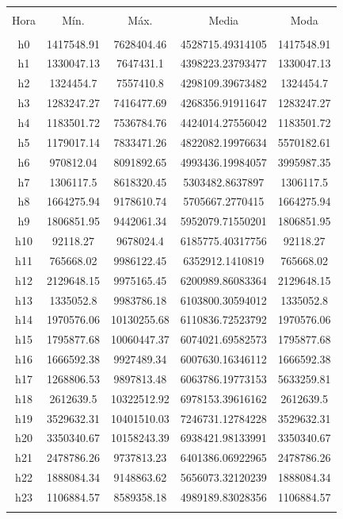 \documentclass[conference, 10pt]{IEEEtran}
\begin{document}
\begin{table}[!htbp] \centering 
  \caption{} 
  \label{} 
\begin{tabular}{@{\extracolsep{5pt}} ccccc} 
\\[-1.8ex]\hline 
\hline \\[-1.8ex] 
Hora & Mín. & Máx. & Media & Moda \\ 
\hline \\[-1.8ex] 
h0 & 1417548.91 & 7628404.46 & 4528715.49314105 & 1417548.91 \\ 
h1 & 1330047.13 & 7647431.1 & 4398223.23793477 & 1330047.13 \\ 
h2 & 1324454.7 & 7557410.8 & 4298109.39673482 & 1324454.7 \\ 
h3 & 1283247.27 & 7416477.69 & 4268356.91911647 & 1283247.27 \\ 
h4 & 1183501.72 & 7536784.76 & 4424014.27556042 & 1183501.72 \\ 
h5 & 1179017.14 & 7833471.26 & 4822082.19976634 & 5570182.61 \\ 
h6 & 970812.04 & 8091892.65 & 4993436.19984057 & 3995987.35 \\ 
h7 & 1306117.5 & 8618320.45 & 5303482.8637897 & 1306117.5 \\ 
h8 & 1664275.94 & 9178610.74 & 5705667.2770415 & 1664275.94 \\ 
h9 & 1806851.95 & 9442061.34 & 5952079.71550201 & 1806851.95 \\ 
h10 & 92118.27 & 9678024.4 & 6185775.40317756 & 92118.27 \\ 
h11 & 765668.02 & 9986122.45 & 6352912.1410819 & 765668.02 \\ 
h12 & 2129648.15 & 9975165.45 & 6200989.86083364 & 2129648.15 \\ 
h13 & 1335052.8 & 9983786.18 & 6103800.30594012 & 1335052.8 \\ 
h14 & 1970576.06 & 10130255.68 & 6110836.72523792 & 1970576.06 \\ 
h15 & 1795877.68 & 10060447.37 & 6074021.69582573 & 1795877.68 \\ 
h16 & 1666592.38 & 9927489.34 & 6007630.16346112 & 1666592.38 \\ 
h17 & 1268806.53 & 9897813.48 & 6063786.19773153 & 5633259.81 \\ 
h18 & 2612639.5 & 10322512.92 & 6978153.39616162 & 2612639.5 \\ 
h19 & 3529632.31 & 10401510.03 & 7246731.12784228 & 3529632.31 \\ 
h20 & 3350340.67 & 10158243.39 & 6938421.98133991 & 3350340.67 \\ 
h21 & 2478786.26 & 9737813.23 & 6401386.06922965 & 2478786.26 \\ 
h22 & 1888084.34 & 9148863.62 & 5656073.32120239 & 1888084.34 \\ 
h23 & 1106884.57 & 8589358.18 & 4989189.83028356 & 1106884.57 \\ 
\hline \\[-1.8ex] 
\end{tabular} 
\end{table}
\end{document}
